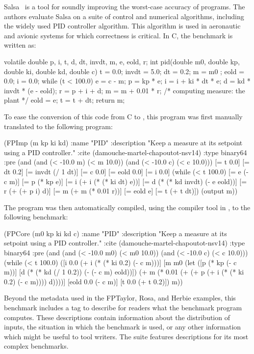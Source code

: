 \documentclass[main.tex]{subfiles}
\begin{document}
Salsa~\cite{fmics15} is a tool for soundly improving the worst-case
accuracy of programs.  The authors evaluate Salsa on a suite of control and
numerical algorithms, including the widely used PID controller algorithm.
This algorithm is used in aeronautic and avionic systems for which
correctness is critical. In C, the benchmark is written as:

\begin{code}
volatile double p, i, t, d, dt, invdt, m, e, eold, r; 
int pid(double m0, double kp, double ki, double kd, double c){
  t     = 0.0;
  invdt = 5.0;
  dt    = 0.2;
  m     = m0 ;
  eold  = 0.0;
  i     = 0.0;
  while (t < 100.0) {
       e = c - m;
       p = kp * e;
       i = i + ki * dt * e;
       d = kd * invdt * (e - eold);
       r = p + i + d;
       m = m + 0.01 * r; /* computing measure: the plant */
       eold = e;
       t = t + dt;
  }
  return m;
}
\end{code}

To ease the conversion of this code from C to \core,
  this program was first manually translated
  to the following \surface program:

\begin{code}
(FPImp (m kp ki kd)
 :name "PID"
 :description "Keep a measure at its setpoint using a PID controller."
 :cite (damouche-martel-chapoutot-nsv14)
 :type binary64
 :pre (and (and (< -10.0 m) (< m 10.0)) (and (< -10.0 c) (< c 10.0)))
 [= t 0.0]
 [= dt 0.2]
 [= invdt (/ 1 dt)]
 [= c 0.0]
 [= eold 0.0]
 [= i 0.0]
 (while (< t 100.0)
   [= e (- c m)]
   [= p (* kp e)]
   [= i (+ i (* (* ki dt) e))]
   [= d (* (* kd invdt) (- e eold))]
   [= r (+ (+ p i) d)]
   [= m (+ m (* 0.01 r))]
   [= eold e]
   [= t (+ t dt)])
 (output m))
\end{code}

The \surface program was then automatically compiled,
  using the compiler tool in \name,
  to the following \core benchmark:

\begin{code}
(FPCore (m0 kp ki kd c)
  :name "PID"
  :description "Keep a measure at its setpoint using a PID controller."
  :cite (damouche-martel-chapoutot-nsv14)
  :type binary64
  :pre (and (and (< -10.0 m0) (< m0 10.0)) (and (< -10.0 c) (< c 10.0)))
  (while (< t 100.0)
   ([i 0.0 (+ i (* (* ki 0.2) (- c m)))]
    [m m0
     (let ([p (* kp (- c m))]
           [d (* (* kd (/ 1 0.2)) (- (- c m) eold))])
     (+ m (* 0.01 (+ (+ p (+ i (* (* ki 0.2) (- c m)))) d))))]
    [eold 0.0 (- c m)]
    [t 0.0 (+ t 0.2)])
   m))
\end{code}

Beyond the metadata used in the FPTaylor, Rosa, and Herbie examples,
  this benchmark includes a  tag
  to describe for readers what the benchmark program computes.
These descriptions contain information about the distribution of inputs,
  the situation in which the benchmark is used,
  or any other information which might be useful to tool writers.
The \name suite features descriptions for its most complex benchmarks.
\end{document}
